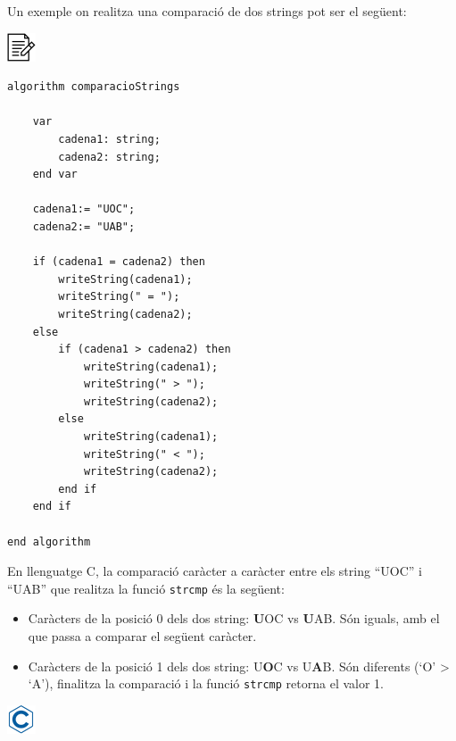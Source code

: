 \documentclass[]{book}
\providecommand{\tightlist}{%
  \setlength{\itemsep}{0pt}\setlength{\parskip}{0pt}}
\begin{document}
Un exemple on realitza una comparació de dos strings pot ser el següent:

\includegraphics{./img/alg.png}

\begin{verbatim}
algorithm comparacioStrings

    var
        cadena1: string;
        cadena2: string;
    end var

    cadena1:= "UOC";
    cadena2:= "UAB";

    if (cadena1 = cadena2) then
        writeString(cadena1);
        writeString(" = ");
        writeString(cadena2);
    else
        if (cadena1 > cadena2) then
            writeString(cadena1);
            writeString(" > ");
            writeString(cadena2);
        else
            writeString(cadena1);
            writeString(" < ");
            writeString(cadena2);
        end if
    end if

end algorithm
\end{verbatim}

En llenguatge C, la comparació caràcter a caràcter entre els string
``UOC'' i ``UAB'' que realitza la funció \texttt{strcmp} és la següent:

\begin{itemize}
\tightlist
\item
  Caràcters de la posició 0 dels dos string: \textbf{U}OC vs
  \textbf{U}AB. Són iguals, amb el que passa a comparar el següent
  caràcter.
\item
  Caràcters de la posició 1 dels dos string: U\textbf{O}C vs
  U\textbf{A}B. Són diferents (`O' \textgreater{} `A'), finalitza la
  comparació i la funció \texttt{strcmp} retorna el valor 1.
\end{itemize}

\includegraphics{./img/c.png}
\end{document}
